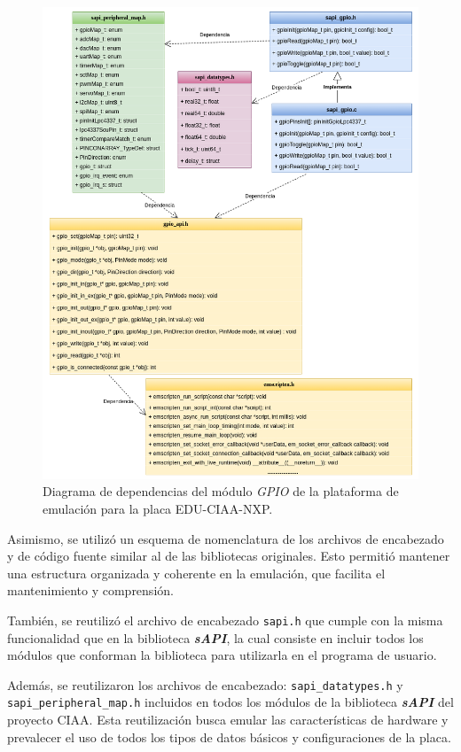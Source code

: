 \begin{figure}[ht]
	\centering
	\includegraphics[scale=.41]{./Figures/DiagramaClasesEmulador.png}
	\caption{Diagrama de dependencias del módulo \textit{GPIO} de la plataforma de emulación para la placa EDU-CIAA-NXP.}
	\label{fig:GPIOEmulador}
\end{figure}

Asimismo, se utilizó un esquema de nomenclatura de los archivos de encabezado y de código fuente similar al de las bibliotecas originales.  Esto permitió mantener una estructura organizada y coherente en la emulación, que facilita el mantenimiento y comprensión.

También, se reutilizó el archivo de encabezado \texttt{sapi.h} que cumple con la misma funcionalidad que en la biblioteca \textit{\textbf{sAPI}}, la cual consiste en incluir todos los módulos que conforman la biblioteca para utilizarla en el programa de usuario. 

Además, se reutilizaron los archivos de encabezado: \texttt{sapi\_datatypes.h} y \newline \texttt{sapi\_peripheral\_map.h} incluidos en todos los módulos de la biblioteca \textit{\textbf{sAPI}} del proyecto CIAA. Esta reutilización busca emular las características de hardware y prevalecer el uso de todos los tipos de datos básicos y configuraciones de la placa.

